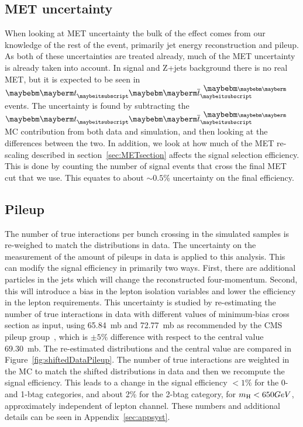 
\subsection{MET uncertainty}

When looking at MET uncertainty the bulk of the effect comes from our knowledge of the rest of the event, primarily jet energy reconstruction and pileup.  As both of these uncertainties are treated already, much of the MET uncertainty is already taken into account.  In signal and Z+jets background there is no real MET, but it is expected to be seen in $\Pqt \Paqt$ events.  The uncertainty is found by subtracting the $\Pqt \Paqt$ MC contribution from both data and simulation, and then looking at the differences between the two. In addition, we look at how much of the MET re-scaling described in section~\ref{sec:METsection} affects the signal selection efficiency.  This is done by counting the number of signal events that cross the final MET cut that we use.  This equates to about $\sim 0.5$\% uncertainty on the final efficiency.

\subsection{Pileup}
\label{sec:pileupSystematics}
The number of true interactions per bunch crossing in the simulated samples is re-weighed to match the distributions in data. The uncertainty on the measurement of the amount of pileups in data is applied to this analysis. This can modify the signal efficiency in primarily two ways.  First, there are additional particles in the jets which will change the reconstructed four-momentum.  Second, this will introduce a bias in the lepton isolation variables and lower the efficiency in the lepton requirements. 
  This uncertainty is studied by re-estimating the number of true interactions in data with different values of minimum-bias cross section as input, using 65.84~mb and 72.77~mb as recommended by the CMS pileup group~\cite{pileupsys}, which is $\pm 5\%$ difference with respect to the central value 69.30~mb. The re-estimated distributions and the central value are compared in Figure~\ref{fig:shiftedDataPileup}. The number of true interactions are weighted in the MC to match the shifted distributions in data and then we recompute the signal efficiency. This leads to a change in the signal efficiency $< 1\%$ for the 0- and 1-btag categories, and about 2\% for the 2-btag category, for $m_{\mathrm{H}} < 650 GeV$, approximately independent of lepton channel.  These numbers and additional details can be seen in Appendix~\ref{sec:appsyst}.

